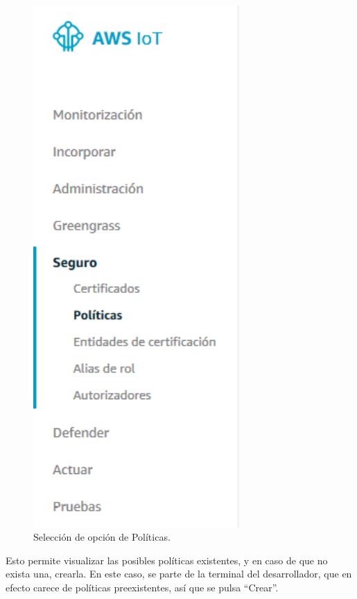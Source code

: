 \documentclass[english,runningheads,a4paper]{llncs}[2018/03/10]
\begin{document}
\begin{figure}[h!]
 \centering
 \includegraphics[width=0.7\textwidth]{./IoT/AWS/1-3_politics.png}
 \caption{Selección de opción de Políticas.}
 \label{policies}
\end{figure}

Esto permite visualizar las posibles políticas existentes, y en caso de que no
exista una, crearla. En este caso, se parte de la terminal del desarrollador,
que en efecto carece de políticas preexistentes, así que se pulsa ``Crear''.
\end{document}
